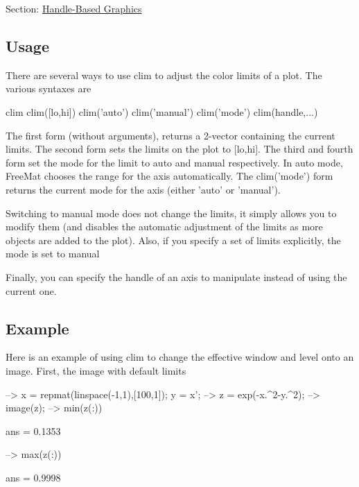 Section\-: \hyperlink{sec_handle}{Handle-\/\-Based Graphics} \hypertarget{vtkwidgets_vtkxyplotwidget_Usage}{}\subsection{Usage}\label{vtkwidgets_vtkxyplotwidget_Usage}
There are several ways to use {\ttfamily clim} to adjust the color limits of a plot. The various syntaxes are \begin{DoxyVerb}   clim
   clim([lo,hi])   
   clim('auto')
   clim('manual')
   clim('mode')
   clim(handle,...)
\end{DoxyVerb}
 The first form (without arguments), returns a 2-\/vector containing the current limits. The second form sets the limits on the plot to {\ttfamily \mbox{[}lo,hi\mbox{]}}. The third and fourth form set the mode for the limit to {\ttfamily auto} and {\ttfamily manual} respectively. In {\ttfamily auto} mode, Free\-Mat chooses the range for the axis automatically. The {\ttfamily clim('mode')} form returns the current mode for the axis (either {\ttfamily 'auto'} or {\ttfamily 'manual'}).

Switching to {\ttfamily manual} mode does not change the limits, it simply allows you to modify them (and disables the automatic adjustment of the limits as more objects are added to the plot). Also, if you specify a set of limits explicitly, the mode is set to {\ttfamily manual}

Finally, you can specify the handle of an axis to manipulate instead of using the current one. \hypertarget{variables_struct_Example}{}\subsection{Example}\label{variables_struct_Example}
Here is an example of using {\ttfamily clim} to change the effective window and level onto an image. First, the image with default limits


\begin{DoxyVerbInclude}
--> x = repmat(linspace(-1,1),[100,1]); y = x';
--> z = exp(-x.^2-y.^2);
--> image(z);
--> min(z(:))

ans = 
    0.1353 

--> max(z(:))

ans = 
    0.9998 
\end{DoxyVerbInclude}


